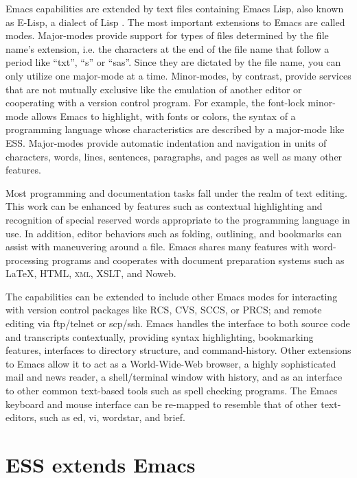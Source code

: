 \documentclass{article}
\begin{document}
Emacs capabilities are extended by text files containing Emacs Lisp,
also known as E-Lisp, a dialect of Lisp
\citep{RChassell1999,PGraham:1996}.  The most important extensions to
Emacs are called modes.  Major-modes provide support for types of
files determined by the file name's extension, i.e. the characters at
the end of the file name that follow a period like ``txt'', ``s'' or
``sas''.  Since they are dictated by the file name, you can only
utilize one major-mode at a time.  Minor-modes, by contrast, provide
services that are not mutually exclusive like the emulation of another
editor or cooperating with a version control program.  For example,
the font-lock minor-mode allows Emacs to highlight, with fonts or
colors, the syntax of a programming language whose characteristics are
described by a major-mode like ESS.  Major-modes provide automatic
indentation and navigation in units of characters, words, lines,
sentences, paragraphs, and pages as well as many other features.

Most programming and documentation tasks fall under the realm of text
editing.  This work can be enhanced by features such as contextual
highlighting and recognition of special reserved words appropriate to
the programming language in use.  In addition, editor behaviors such
as folding, outlining, and bookmarks can assist with maneuvering
around a file.  Emacs shares many features with word-processing
programs and cooperates with document preparation systems such as
\LaTeX, HTML, \textsc{xml}, XSLT, and Noweb.

The capabilities can be extended to include other Emacs modes for
interacting with version control packages like RCS, CVS, SCCS, or
PRCS; and remote editing via ftp/telnet or scp/ssh.  Emacs handles the
interface to both source code and transcripts contextually, providing
syntax highlighting, bookmarking features, interfaces to directory
structure, and command-history.  Other extensions to Emacs allow it to
act as a World-Wide-Web browser, a highly sophisticated mail and news
reader, a shell/terminal window with history, and as an interface to
other common text-based tools such as spell checking programs.  The
Emacs keyboard and mouse interface can be re-mapped to resemble that
of other text-editors, such as ed, vi, wordstar, and brief.


\section{ESS extends Emacs}
\label{sec:ess-extends-emacs}
\end{document}
